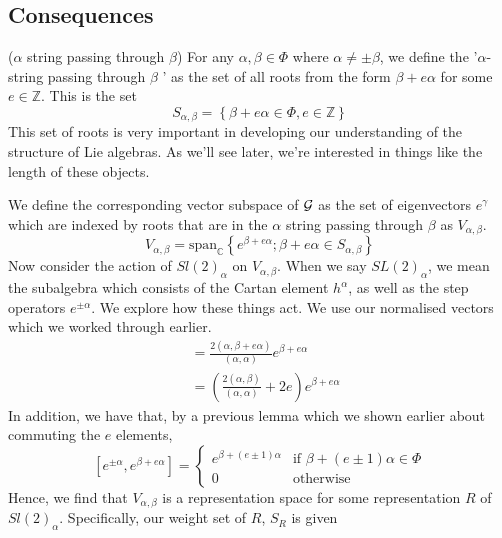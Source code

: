 \subsection{Consequences}

\begin{defn}{($\alpha $ string passing through $ \beta$)}
For any $ \alpha , \beta \in \Phi  $ where  $ \alpha \neq \pm  \beta $, 
we define the '$ \alpha $-string passing through $ \beta $ ' 
as the set of all 
roots from the form $ \beta + e \alpha $ for some
$ e \in \mathbb{ Z} $. This is the set 
\[
S_{ \alpha, \beta } = \left\{  \beta + e \alpha  \in \Phi , e \in \mathbb{ Z}  \right\} 
\] This set of roots is very important 
in developing our understanding of the structure of Lie algebras.
As we'll see later, we're interested in things like the length 
of these objects. 
\end{defn}
We define the corresponding vector subspace of $ \mathcal{ G } $
as the set of eigenvectors $ e^{ \gamma } $ which 
are indexed by roots that are in the $ \alpha $ string 
passing through $ \beta $ as $ V _{ \alpha, \beta } $. 
\[
V _{ \alpha, \beta } = \text{span} _{ \mathbb{ C} } \left\{  
e ^{ \beta + e \alpha} ; \beta + e \alpha \in S_{ \alpha , \beta }\right\} 
\] Now consider the action of $ Sl ( 2) _{ \alpha } $ on 
$ V_{ \alpha, \beta } $. When we say $ SL ( 2 ) _ \alpha $, 
we mean the subalgebra which consists of the 
Cartan element $ h ^ \alpha $, as well as the 
step operators $ e ^{ \pm \alpha }$. We explore how
these things act. We use our normalised vectors which 
we worked through earlier. 
\begin{align*}
[ h ^ \alpha, e ^{ \beta + e \alpha } ] &=  \frac{ 2 ( \alpha, \beta + e \alpha ) }{ 
\left(  \alpha, \alpha  \right)  } e ^{ \beta + e \alpha }  \\
					&=  \left(  \frac{2 ( \alpha , \beta ) }{ ( \alpha, \alpha ) } 
					+ 2 e \right)  e ^{ \beta + e \alpha } 
\end{align*}
In addition, we have that, by a previous lemma 
which we shown earlier about commuting the $ e $ elements, 
\[
[ e ^{ \pm \alpha } , e ^{ \beta + e \alpha} ] =  \begin{cases}
	e ^{ \beta + ( e \pm 1 ) \alpha } & \text{if } \beta + ( e \pm 1 ) \alpha \in \Phi \\
	0 & \text{otherwise}
\end{cases}
\]  
Hence, we find that $ V_{ \alpha, \beta } $ is a representation 
space for some representation $ R $ of $ Sl ( 2 )_ \alpha $. 
Specifically, our weight set of $ R $, $ S _ R $ is given
